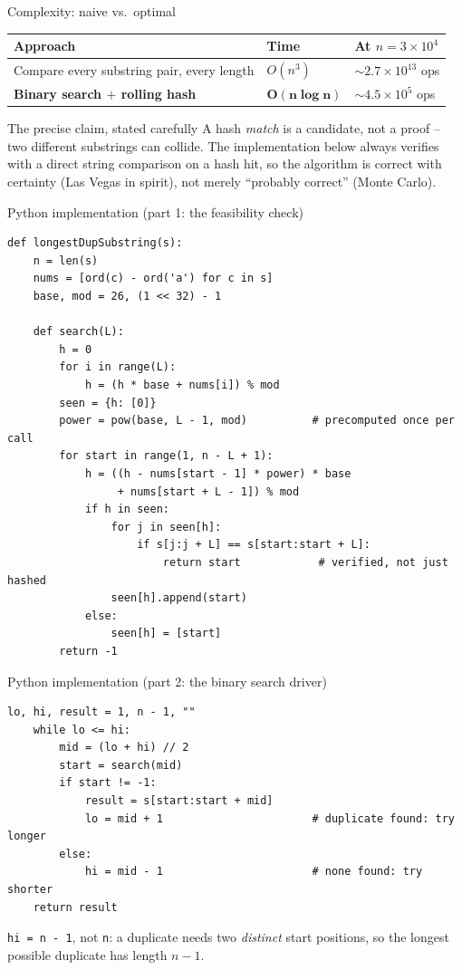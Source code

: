 \documentclass[11pt,aspectratio=169]{beamer}
\begin{document}
\begin{frame}{Complexity: naive vs.\ optimal}
  \begin{center}
  \begin{tabular}{@{}lll@{}}
    \toprule
    Approach & Time & At $n=3\times10^4$ \\
    \midrule
    Compare every substring pair, every length & $O(n^3)$ & $\sim 2.7\times10^{13}$
    ops \\
    \textbf{Binary search $+$ rolling hash} & $\boldsymbol{O(n\log n)}$ &
    $\sim 4.5\times10^5$ ops \\
    \bottomrule
  \end{tabular}
  \end{center}
  \begin{alertblock}{The precise claim, stated carefully}
    A hash \emph{match} is a candidate, not a proof -- two different substrings can
    collide. The implementation below always verifies with a direct string comparison
    on a hash hit, so the algorithm is correct with certainty (Las Vegas in spirit),
    not merely ``probably correct'' (Monte Carlo).
  \end{alertblock}
\end{frame}

\begin{frame}[fragile]{Python implementation (part 1: the feasibility check)}
  \begin{lstlisting}[style=py,aboveskip=0pt,belowskip=0pt,basicstyle=\ttfamily\tiny]
def longestDupSubstring(s):
    n = len(s)
    nums = [ord(c) - ord('a') for c in s]
    base, mod = 26, (1 << 32) - 1

    def search(L):
        h = 0
        for i in range(L):
            h = (h * base + nums[i]) % mod
        seen = {h: [0]}
        power = pow(base, L - 1, mod)          # precomputed once per call
        for start in range(1, n - L + 1):
            h = ((h - nums[start - 1] * power) * base
                 + nums[start + L - 1]) % mod
            if h in seen:
                for j in seen[h]:
                    if s[j:j + L] == s[start:start + L]:
                        return start            # verified, not just hashed
                seen[h].append(start)
            else:
                seen[h] = [start]
        return -1
  \end{lstlisting}
\end{frame}

\begin{frame}[fragile]{Python implementation (part 2: the binary search driver)}
  \begin{lstlisting}[style=py]
    lo, hi, result = 1, n - 1, ""
    while lo <= hi:
        mid = (lo + hi) // 2
        start = search(mid)
        if start != -1:
            result = s[start:start + mid]
            lo = mid + 1                       # duplicate found: try longer
        else:
            hi = mid - 1                       # none found: try shorter
    return result
  \end{lstlisting}
  \vspace{0.5em}
  \texttt{hi = n - 1}, not \texttt{n}: a duplicate needs two \emph{distinct} start
  positions, so the longest possible duplicate has length $n-1$.
\end{frame}
\end{document}
